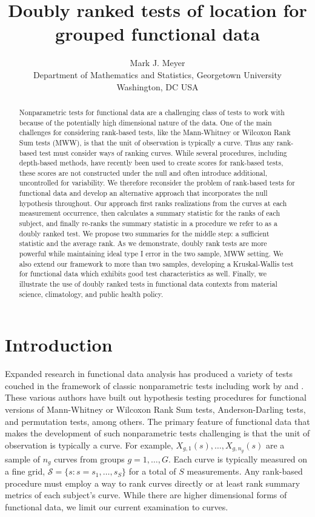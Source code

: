 \documentclass[12pt]{article}
\title{\vspace{-40pt}Doubly ranked tests of location for grouped functional data\vspace{-10pt}}
\author{Mark J. Meyer \\ Department of Mathematics and Statistics, Georgetown University \\ Washington, DC USA}
\date{}
\theoremstyle{plain}
\theoremstyle{remark}
\begin{document}
	\maketitle
	
\begin{abstract}
Nonparametric tests for functional data are a challenging class of tests to work with because of the potentially high dimensional nature of the data. One of the main challenges for considering rank-based tests, like the Mann-Whitney or Wilcoxon Rank Sum tests (MWW), is that the unit of observation is typically a curve. Thus any rank-based test must consider ways of ranking curves. While several procedures, including depth-based methods, have recently been used to create scores for rank-based tests, these scores are not constructed under the null and often introduce additional, uncontrolled for variability. We therefore reconsider the problem of rank-based tests for functional data and develop an alternative approach that incorporates the null hypothesis throughout. Our approach first ranks realizations from the curves at each measurement occurrence, then calculates a summary statistic for the ranks of each subject, and finally re-ranks the summary statistic in a procedure we refer to as a doubly ranked test. We propose two summaries for the middle step: a sufficient statistic and the average rank. As we demonstrate, doubly rank tests are more powerful while maintaining ideal type I error in the two sample, MWW setting. We also extend our framework to more than two samples, developing a Kruskal-Wallis test for functional data which exhibits good test characteristics as well. Finally, we illustrate the use of doubly ranked tests in functional data contexts from material science, climatology, and public health policy.
\end{abstract}

	\section{Introduction}
	\label{s:intro}
	
	Expanded research in functional data analysis has produced a variety of tests couched in the framework of classic nonparametric tests including work by \cite{Hall2007, Lopez2009, Lopez2010, Chak2015, PomannStaicu2016, Lopez2017, Abramowicz2018, Berrett2021} and \cite{Melendez2021}. These various authors have built out hypothesis testing procedures for functional versions of Mann-Whitney or Wilcoxon Rank Sum tests, Anderson-Darling tests, and permutation tests, among others. The primary feature of functional data that makes the development of such nonparametric tests challenging is that the unit of observation is typically a curve. For example, $X_{g,1}(s), \ldots, X_{g,n_g}(s)$ are a sample of $n_g$ curves from groups $g = 1, \ldots, G$. Each curve is typically measured on a fine grid, $\mathcal{S} = \{s : s = s_1, \ldots, s_S\}$ for a total of $S$ measurements. Any rank-based procedure must employ a way to rank curves directly or at least rank summary metrics of each subject's curve. While there are higher dimensional forms of functional data, we limit our current examination to curves. 
	
\end{document}
